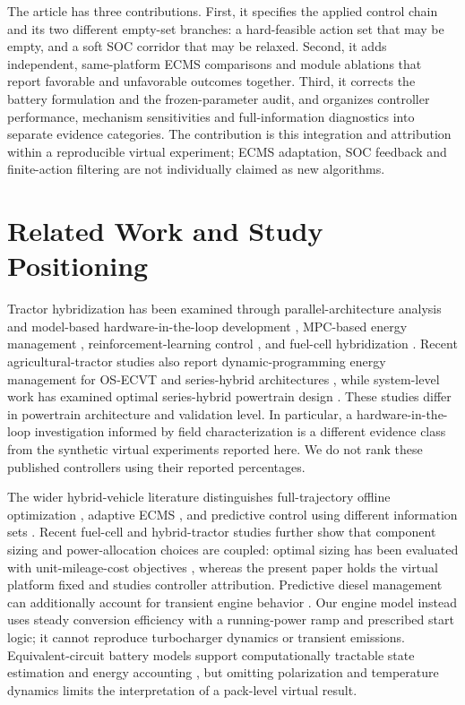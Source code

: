\documentclass[energies,article,submit,moreauthors]{Definitions/mdpi}
\begin{document}
The article has three contributions. First, it specifies the applied control chain and its two different empty-set branches: a hard-feasible action set that may be empty, and a soft SOC corridor that may be relaxed. Second, it adds independent, same-platform ECMS comparisons and module ablations that report favorable and unfavorable outcomes together. Third, it corrects the battery formulation and the frozen-parameter audit, and organizes controller performance, mechanism sensitivities and full-information diagnostics into separate evidence categories. The contribution is this integration and attribution within a reproducible virtual experiment; ECMS adaptation, SOC feedback and finite-action filtering are not individually claimed as new algorithms.

\section{Related Work and Study Positioning}
Tractor hybridization has been examined through parallel-architecture analysis and model-based hardware-in-the-loop development \cite{mocera2020,mocera2020b}, MPC-based energy management \cite{curiel2023}, reinforcement-learning control \cite{wu2024}, and fuel-cell hybridization \cite{zhao2024,zhang2024freq}. Recent agricultural-tractor studies also report dynamic-programming energy management for OS-ECVT and series-hybrid architectures \cite{zhang2024osecvt,yan2024series}, while system-level work has examined optimal series-hybrid powertrain design \cite{perez2024}. These studies differ in powertrain architecture and validation level. In particular, a hardware-in-the-loop investigation informed by field characterization is a different evidence class from the synthetic virtual experiments reported here. We do not rank these published controllers using their reported percentages.

The wider hybrid-vehicle literature distinguishes full-trajectory offline optimization \cite{xie2016}, adaptive ECMS \cite{musardo2005}, and predictive control using different information sets \cite{ripaccioli2010,zhang2017,wang2016}. Recent fuel-cell and hybrid-tractor studies further show that component sizing and power-allocation choices are coupled: optimal sizing has been evaluated with unit-mileage-cost objectives \cite{wang2025sizing}, whereas the present paper holds the virtual platform fixed and studies controller attribution. Predictive diesel management can additionally account for transient engine behavior \cite{huo2018}. Our engine model instead uses steady conversion efficiency with a running-power ramp and prescribed start logic; it cannot reproduce turbocharger dynamics or transient emissions. Equivalent-circuit battery models support computationally tractable state estimation and energy accounting \cite{plett2004}, but omitting polarization and temperature dynamics limits the interpretation of a pack-level virtual result.
\end{document}
